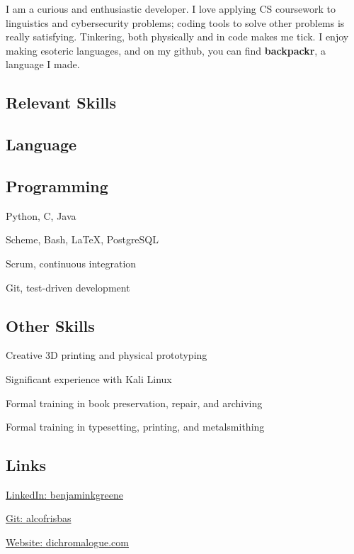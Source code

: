 \documentclass{cv}
\begin{document}
\linespread{0.9}
\noindent{}
I am a curious and enthusiastic developer. I love applying  CS coursework to linguistics and cybersecurity problems; coding tools to solve other problems is really satisfying. Tinkering, both physically and in code makes me tick.
I enjoy making esoteric languages, and on my github, you can find \textbf{backpackr}, a language I made.

\begin{paracol}{2}
\begin{raggedright}
\section{Relevant Skills}
\subsection{Language}
\subsection{Programming}
\begin{closeitems}
\item Python, C, Java
\item Scheme, Bash, \LaTeX, PostgreSQL
\item Scrum, continuous integration
\item Git, test-driven development
\end{closeitems}
\subsection{Other Skills}
\begin{closeitems}
\item Creative 3D printing and physical prototyping
\item Significant experience with Kali Linux
\item Formal training in book preservation, repair, and archiving
\item Formal training in typesetting, printing, and metalsmithing
\end{closeitems}
\subsection{Links}
\begin{closeitems}
\item \href{http://www.linkedin.com/in/benjaminkgreene}{LinkedIn: \small{benjaminkgreene}}
\item \href{http://www.github.com/alcofrisbas}{Git: \small{alcofrisbas}}
\item \href{http://www.dichromalogue.com}{Website: \small{dichromalogue.com}}
\end{closeitems}

\end{raggedright}
\end{paracol}
\end{document}
